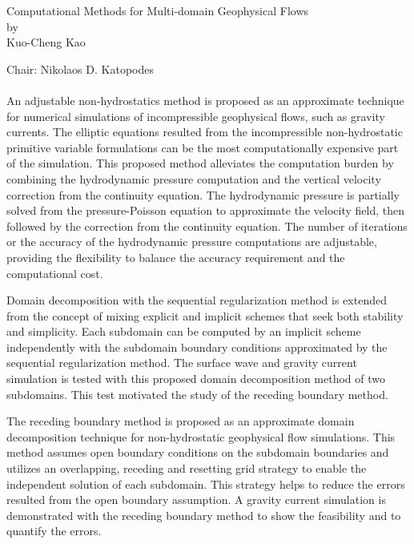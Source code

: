 \pagestyle{empty}


\begin{center}
\vspace{-1.1in}
\large{Computational Methods for Multi-domain Geophysical Flows\\
\vspace{0.1in}
by \\
\vspace{0.1in}
Kuo-Cheng Kao \\}
\end{center}
\vspace{0.5in}
\hspace{-0.15in}
\large{Chair: Nikolaos D. Katopodes\\}
\\

An adjustable non-hydrostatics method is proposed as an approximate technique for numerical simulations of incompressible geophysical flows, such as gravity currents. The elliptic equations resulted from the incompressible non-hydrostatic primitive variable formulations can be the most computationally expensive part of the simulation. This proposed method alleviates the computation burden by combining the hydrodynamic pressure computation and the vertical velocity correction from the continuity equation. The hydrodynamic pressure is partially solved from the pressure-Poisson equation to approximate the velocity field, then followed by the correction from the continuity equation. The number of iterations or the accuracy of the hydrodynamic pressure computations are adjustable, providing the flexibility to balance the accuracy requirement and the computational cost.

Domain decomposition with the sequential regularization method is extended from the concept of mixing explicit and implicit schemes that seek both stability and simplicity. Each subdomain can be computed by an implicit scheme independently with the subdomain boundary conditions approximated by the sequential regularization method. The surface wave and gravity current simulation is tested with this proposed domain decomposition method of two subdomains. This test motivated the study of the receding boundary method.


The receding boundary method is proposed as an approximate domain decomposition technique for non-hydrostatic geophysical flow simulations. This method assumes open boundary conditions on the subdomain boundaries and utilizes an overlapping, receding and resetting grid strategy to enable the independent solution of each subdomain.
This strategy helps to reduce the errors resulted from the open boundary assumption. A gravity current simulation is demonstrated with the receding boundary method to show the feasibility and to quantify the errors.

\cp






